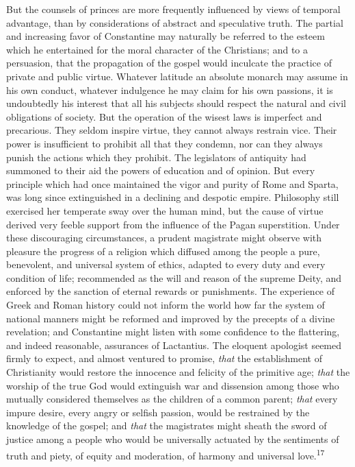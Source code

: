 
But the counsels of princes are more frequently influenced by views of
temporal advantage, than by considerations of abstract and speculative
truth. The partial and increasing favor of Constantine may naturally be
referred to the esteem which he entertained for the moral character of
the Christians; and to a persuasion, that the propagation of the gospel
would inculcate the practice of private and public virtue. Whatever
latitude an absolute monarch may assume in his own conduct, whatever
indulgence he may claim for his own passions, it is undoubtedly his
interest that all his subjects should respect the natural and civil
obligations of society. But the operation of the wisest laws is
imperfect and precarious. They seldom inspire virtue, they cannot
always restrain vice. Their power is insufficient to prohibit all that
they condemn, nor can they always punish the actions which they
prohibit. The legislators of antiquity had summoned to their aid the
powers of education and of opinion. But every principle which had once
maintained the vigor and purity of Rome and Sparta, was long since
extinguished in a declining and despotic empire. Philosophy still
exercised her temperate sway over the human mind, but the cause of
virtue derived very feeble support from the influence of the Pagan
superstition. Under these discouraging circumstances, a prudent
magistrate might observe with pleasure the progress of a religion which
diffused among the people a pure, benevolent, and universal system of
ethics, adapted to every duty and every condition of life; recommended
as the will and reason of the supreme Deity, and enforced by the
sanction of eternal rewards or punishments. The experience of Greek and
Roman history could not inform the world how far the system of national
manners might be reformed and improved by the precepts of a divine
revelation; and Constantine might listen with some confidence to the
flattering, and indeed reasonable, assurances of Lactantius. The
eloquent apologist seemed firmly to expect, and almost ventured to
promise, \textit{that} the establishment of Christianity would restore the
innocence and felicity of the primitive age; \textit{that} the worship of the
true God would extinguish war and dissension among those who mutually
considered themselves as the children of a common parent; \textit{that} every
impure desire, every angry or selfish passion, would be restrained by
the knowledge of the gospel; and \textit{that} the magistrates might sheath
the sword of justice among a people who would be universally actuated
by the sentiments of truth and piety, of equity and moderation, of
harmony and universal love.\textsuperscript{17}

